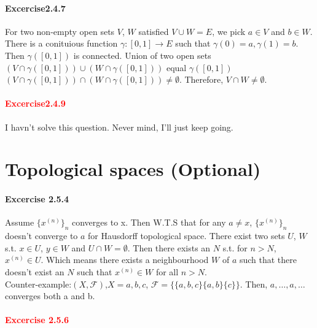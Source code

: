 \paragraph{Excercise2.4.7}For two non-empty open sets $V$, $W$ satisfied $V\cup W=E$, we pick $a\in V$ and $b\in W$. There is a conituious function $\gamma:[0,1]\rightarrow E$ such that $\gamma(0)=a,\gamma(1)=b$. Then $\gamma([0,1])$ is connected. Union of two open sets $(V\cap\gamma([0,1])) \cup (W\cap\gamma([0,1]))$ equal $\gamma([0,1])$ $(V\cap\gamma([0,1])) \cap (W\cap\gamma([0,1]))\neq\emptyset$.
Therefore, $V\cap W\neq\emptyset$. 
\paragraph{\textcolor{red}{Excercise2.4.9}} I havn't solve this question. Never mind, I'll just keep going.
\section{Topological spaces (Optional)}
\paragraph{Excercise 2.5.4}Assume $\{x^{(n)}\}_{n}$ converges to x. Then W.T.S that for any $a\neq x$, $\{x^{(n)}\}_{n}$ doesn't converge to $a$ for Hausdorff topological space. There exist two sets $U$, $W$ s.t. $x\in U$, $y\in W$ and $U\cap W=\emptyset$. Then there exists an $N$ s.t. for $n>N$, $x^{(n)}\in U$. Which means there exists a neighbourhood $W$ of $a$ such that there doesn't exist an $N$ such that $x^{(n)}\in W$ for all $n>N$.\\
Counter-example:$(X,\mathcal{F})$,$X={a,b,c}$, $\mathcal{F}=\{\{a,b,c\}\{a,b\}\{c\}\}$. Then, $a,\dots, a,\dots$ converges both a and b.
\paragraph{\textcolor{red}{Excercise 2.5.6}}

















